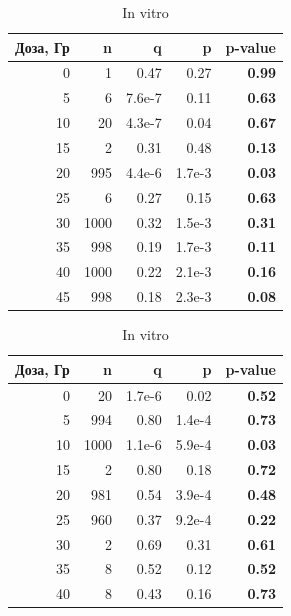 \documentclass[12pt, specialist, subf, substylefile = spbu_report.rtx]{disser}
\begin{document}
	\begin{table}[ht]
		\centering
		\caption*{Оценки параметров и значимости критерия хи-квадрат логарифмически-биномиального распределения.}
		\small
		\begin{minipage}{0.48\textwidth}
			\centering
			\caption{In vivo}
			
			\begin{tabular}{rrrrr}
				\hline
				Доза, Гр & n & q & p & \textbf{p-value} \\ 
				\hline
				0 & 1 & 0.47 & 0.27 & \textbf{0.99} \\ 
				5 & 6 & 7.6e-7 & 0.11 & \textbf{0.63} \\ 
				10 & 20 & 4.3e-7 & 0.04 & \textbf{0.67} \\ 
				15 & 2 & 0.31 & 0.48 & \textbf{0.13} \\ 
				20 & 995 & 4.4e-6 & 1.7e-3 & \textbf{0.03} \\ 
				25 & 6 & 0.27 & 0.15 & \textbf{0.63} \\ 
				30 & 1000 & 0.32 & 1.5e-3 & \textbf{0.31} \\ 
				35 & 998 & 0.19 & 1.7e-3 & \textbf{0.11} \\ 
				40 & 1000 & 0.22 & 2.1e-3 & \textbf{0.16} \\
				45 & 998 & 0.18 & 2.3e-3 & \textbf{0.08} \\ 
				\hline
			\end{tabular}
			\label{tab:logbinomvivo}
		\end{minipage}
		\hfill
		\begin{minipage}{0.48\textwidth}
			\centering
			\caption{In vitro}
			
			\begin{tabular}{rrrrr}
				\hline
				Доза, Гр & n & q & p & \textbf{p-value} \\ 
				\hline
				0 & 20 & 1.7e-6 & 0.02 & \textbf{0.52} \\ 
				5 & 994 & 0.80 & 1.4e-4 & \textbf{0.73} \\ 
				10 & 1000 & 1.1e-6 & 5.9e-4 & \textbf{0.03} \\ 
				15 & 2 & 0.80 & 0.18 & \textbf{0.72} \\ 
				20 & 981 & 0.54 & 3.9e-4 & \textbf{0.48} \\ 
				25 & 960 & 0.37 & 9.2e-4 & \textbf{0.22} \\ 
				30 & 2 & 0.69 & 0.31 & \textbf{0.61} \\ 
				35 & 8 & 0.52 & 0.12 & \textbf{0.52} \\ 
				40 & 8 & 0.43 & 0.16 & \textbf{0.73} \\
				\hline
			\end{tabular}
			\label{tab:logbinomvitro}
		\end{minipage}
		\label{tab:logbinom}
	\end{table}
\end{document}
